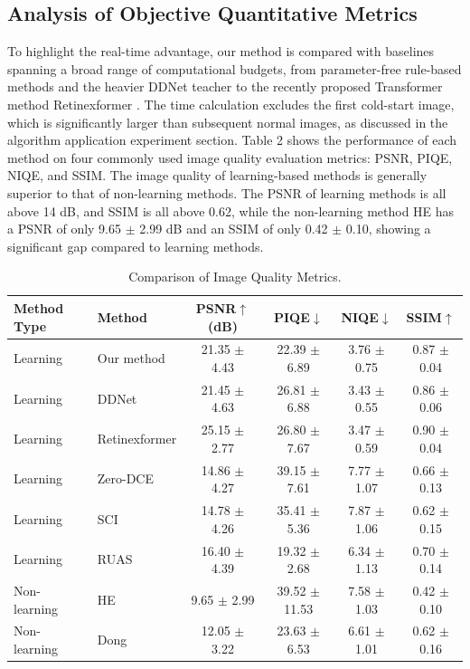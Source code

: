 \documentclass[sensors,article,submit,moreauthors]{Definitions/mdpi}
\begin{document}
\subsection{Analysis of Objective Quantitative Metrics}

To highlight the real-time advantage, our method is compared with baselines spanning a broad range of computational budgets, from parameter-free rule-based methods and the heavier DDNet teacher to the recently proposed Transformer method Retinexformer \cite{ref34}. The time calculation excludes the first cold-start image, which is significantly larger than subsequent normal images, as discussed in the algorithm application experiment section. Table 2 shows the performance of each method on four commonly used image quality evaluation metrics: PSNR, PIQE, NIQE, and SSIM. The image quality of learning-based methods is generally superior to that of non-learning methods. The PSNR of learning methods is all above 14 dB, and SSIM is all above 0.62, while the non-learning method HE has a PSNR of only 9.65 $\pm$ 2.99 dB and an SSIM of only 0.42 $\pm$ 0.10, showing a significant gap compared to learning methods.

\begin{table}[H]
\caption{Comparison of Image Quality Metrics.\label{tab2}}
\begin{tabularx}{\textwidth}{LLCCCC}
\toprule
\textbf{Method Type}	& \textbf{Method}	& \textbf{PSNR$\uparrow$ (dB)}	& \textbf{PIQE$\downarrow$}	& \textbf{NIQE$\downarrow$}	& \textbf{SSIM$\uparrow$}\\
\midrule
Learning	& Our method	& 21.35 $\pm$ 4.43	& 22.39 $\pm$ 6.89	& 3.76 $\pm$ 0.75	& 0.87 $\pm$ 0.04\\
Learning	& DDNet \cite{ref25}	& 21.45 $\pm$ 4.63	& 26.81 $\pm$ 6.88	& 3.43 $\pm$ 0.55	& 0.86 $\pm$ 0.06\\
Learning	& Retinexformer \cite{ref34}	& 25.15 $\pm$ 2.77	& 26.80 $\pm$ 7.67	& 3.47 $\pm$ 0.59	& 0.90 $\pm$ 0.04\\
Learning	& Zero-DCE \cite{ref26}	& 14.86 $\pm$ 4.27	& 39.15 $\pm$ 7.61	& 7.77 $\pm$ 1.07	& 0.66 $\pm$ 0.13\\
Learning	& SCI \cite{ref27}	& 14.78 $\pm$ 4.26	& 35.41 $\pm$ 5.36	& 7.87 $\pm$ 1.06	& 0.62 $\pm$ 0.15\\
Learning	& RUAS \cite{ref9}	& 16.40 $\pm$ 4.39	& 19.32 $\pm$ 2.68	& 6.34 $\pm$ 1.13	& 0.70 $\pm$ 0.14\\
Non-learning	& HE \cite{ref28}	& 9.65 $\pm$ 2.99	& 39.52 $\pm$ 11.53	& 7.58 $\pm$ 1.03	& 0.42 $\pm$ 0.10\\
Non-learning	& Dong \cite{ref29}	& 12.05 $\pm$ 3.22	& 23.63 $\pm$ 6.53	& 6.61 $\pm$ 1.01	& 0.62 $\pm$ 0.16\\
\bottomrule
\end{tabularx}
\end{table}
\end{document}
